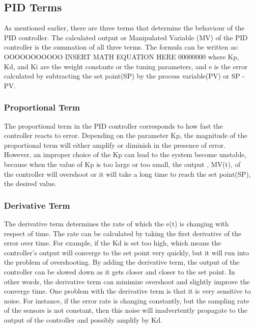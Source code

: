 \subsection{PID Terms}
As mentioned earlier, there are three terms that determine the behaviour of the PID controller. The calculated output or Manipulated Variable (MV) of the PID controller is the summation of all three terms. The formula can be written as: OOOOOOOOOOO INSERT MATH EQUATION HERE 00000000 where Kp, Kd, and Ki are the weight constants or the tuning parameters, and e is the error calculated by subtracting the set point(SP) by the process variable(PV) or SP - PV.

\subsubsection{Proportional Term}
The proportional term in the PID controller corresponds to how fast the controller reacts to error. Depending on the parameter Kp, the magnitude of the proportional term will either amplify or diminish in the presence of error. However, an improper choice of the Kp can lead to the system become unstable, because when the value of Kp is too large or too small, the output , MV(t), of the controller will overshoot or it will take a long time to reach the set point(SP), the desired value. 

\subsubsection{Derivative Term}
The derivative term determines the rate of which the e(t) is changing with respect of time. The rate can be calculated by taking the first derivative of the error over time. For example, if the Kd is set too high, which means the controller's output will converge to the set point very quickly, but it will run into the problem of overshooting. By adding the derivative term, the output of the controller can be slowed down as it gets closer and closer to the set point. In other words, the derivative term can minimize overshoot and slightly improve the converge time. One problem with the derivative term is that it is very sensitive to noise. For instance, if the error rate is changing constantly, but the sampling rate of the sensors is not constant, then this noise will inadvertently propagate to the output of the controller and possibly amplify by Kd. 

